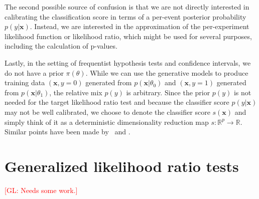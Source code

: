 \documentclass[12pt]{article}
\numberwithin{equation}{section}
\theoremstyle{plain}
\newcommand{\glnote}[1]{\textcolor{red}{[GL: #1]}}
\begin{document}
The second possible source of confusion is that we are not directly interested
in calibrating the classification score in terms of a per-event posterior
probability $p(y|\mathbf{x})$. Instead, we are interested in the approximation of the
per-experiment likelihood function or likelihood ratio, which might be used for
several purposes, including the calculation of p-values.

Lastly, in the setting of frequentist hypothesis tests and confidence intervals,
we do not have a prior $\pi(\theta)$. While we can use the generative models to
produce training data $(\mathbf{x} ,y=0)$ generated from
$p(\mathbf{x}|\theta_0)$ and $(\mathbf{x}, y=1)$ generated from
$p(\mathbf{x}|\theta_1)$, the relative mix $p(y)$ is arbitrary. Since the prior
$p(y)$ is not needed for the target likelihood ratio test and because the
classifier score $p(y|\mathbf{x})$ may not be well calibrated, we choose to denote the
classifier score $s(\mathbf{x})$ and simply think of it as a deterministic dimensionality
reduction map $s: \mathbb{R}^p \to \mathbb{R}$.  Similar points have been made
by~\cite{ClaytonScott} and \cite{Neal:2007zz}.




\section{Generalized likelihood ratio tests}
\label{sec:generalized-likelihood-ratio}

\glnote{Needs some work.}

\end{document}
